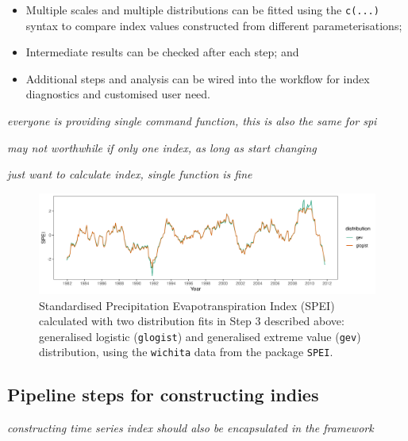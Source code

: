 \documentclass[
]{article}
\providecommand{\tightlist}{%
  \setlength{\itemsep}{0pt}\setlength{\parskip}{0pt}}\usepackage{longtable,booktabs,array}
\begin{document}
\begin{itemize}
\tightlist
\item
  Multiple scales and multiple distributions can be fitted using the
  \texttt{c(...)} syntax to compare index values constructed from
  different parameterisations;
\item
  Intermediate results can be checked after each step; and
\item
  Additional steps and analysis can be wired into the workflow for index
  diagnostics and customised user need.
\end{itemize}

\emph{everyone is providing single command function, this is also the
same for spi}

\emph{may not worthwhile if only one index, as long as start changing}

\emph{just want to calculate index, single function is fine}

\begin{figure}

{\centering \includegraphics[width=1\textwidth,height=0.3\textheight]{../figures/toy-example-spei.png}

}

\caption{\label{fig-toy-example}Standardised Precipitation
Evapotranspiration Index (SPEI) calculated with two distribution fits in
Step 3 described above: generalised logistic (\texttt{glogist}) and
generalised extreme value (\texttt{gev}) distribution, using the
\texttt{wichita} data from the package \texttt{SPEI}.}

\end{figure}

\newpage

\hypertarget{pipeline-steps-for-constructing-indies}{%
\subsection{Pipeline steps for constructing
indies}\label{pipeline-steps-for-constructing-indies}}

\emph{constructing time series index should also be encapsulated in the
framework}
\end{document}
